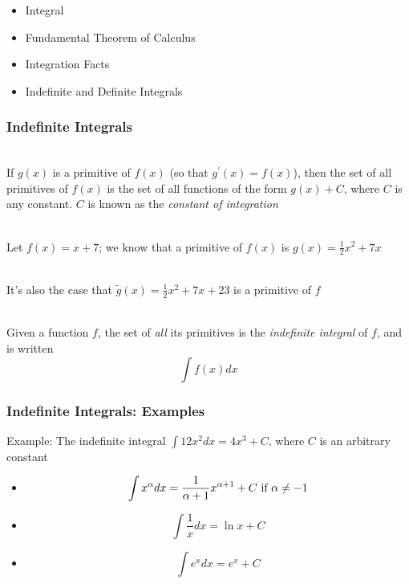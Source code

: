 \documentclass{beamer}
\numberwithin{equation}{section}
\begin{document}
\begin{frame}

\begin{itemize}
\item \textcolor{mygray}{Integral}
\item \textcolor{mygray}{Fundamental Theorem of Calculus}
\item \textcolor{mygray}{Integration Facts}
\item \textcolor{myblack}{Indefinite and Definite Integrals}
\end{itemize}

\end{frame}



\begin{frame}
\frametitle{Indefinite Integrals}

\ \\If $g(x)$ is a primitive of $f(x)$ (so that $g^\prime(x)=f(x)$), then the set of all primitives of $f(x) $ is the set of all functions of the form $g(x)+C$, where $C$ is any constant.  $C$ is known as the \textit{constant of integration} \pause

\ \\Let $f(x)=x+7$; we know that a primitive of $f(x)$ is $g(x)=\frac{1}{2} x^2 + 7x$ \pause

\ \\It's also the case that $\tilde{g}(x)=\frac{1}{2} x^2 + 7x+23$ is a primitive of $f$ \pause

\ \\Given a function $f$, the set of \textit{all} its primitives is the \textit{indefinite integral} of $f$, and is written $$\int f(x) dx$$

\end{frame}



\begin{frame}
\frametitle{Indefinite Integrals: Examples}

Example: The indefinite integral  $\int 12x^2 dx=4x^3+C$, where $C$ is an arbitrary constant \pause

\begin{itemize}
\item[1] $$\int x^\alpha dx = \frac{1}{\alpha+1} x^{\alpha+1}+C \hbox{ if }\alpha\not=-1$$ \pause

\item[2] $$\int \frac{1}{x} dx=\ln x+C $$ \pause

\item[3] $$\int e^x dx =e^x +C$$
\end{itemize}

\end{frame}
\end{document}
